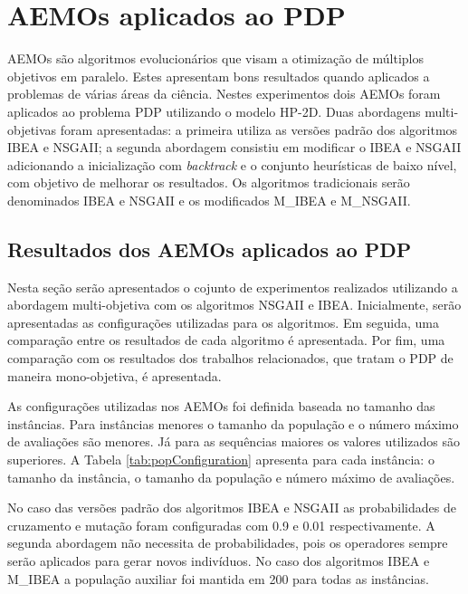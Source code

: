 \section{AEMOs aplicados ao PDP}

AEMOs são algoritmos evolucionários que visam a otimização de múltiplos objetivos em paralelo. Estes apresentam bons resultados quando aplicados a problemas de várias áreas da ciência.  Nestes experimentos dois AEMOs foram aplicados ao problema PDP utilizando o modelo HP-2D. Duas abordagens multi-objetivas foram apresentadas: a primeira utiliza as versões padrão dos algoritmos IBEA e NSGAII; a segunda abordagem consistiu em modificar o IBEA e NSGAII adicionando a inicialização com \textit{backtrack} e o conjunto heurísticas de baixo nível, com objetivo de melhorar os resultados. Os algoritmos tradicionais serão denominados IBEA e NSGAII e os modificados M\_IBEA e M\_NSGAII.




\subsection{Resultados dos AEMOs aplicados ao PDP}

Nesta seção serão apresentados o cojunto de experimentos realizados utilizando a abordagem multi-objetiva com os algoritmos NSGAII e IBEA. Inicialmente, serão apresentadas as configurações utilizadas para os algoritmos. Em seguida, uma comparação entre os resultados de cada algoritmo é apresentada. Por fim, uma comparação com os resultados dos trabalhos relacionados, que tratam o PDP de maneira mono-objetiva, é apresentada.

As configurações utilizadas nos AEMOs foi definida baseada no tamanho das instâncias. Para instâncias menores o tamanho da população e o número máximo de avaliações são menores. Já para as sequências maiores os valores utilizados são superiores. A Tabela \ref{tab:popConfiguration} apresenta para cada instância: o tamanho da instância, o tamanho da população e número máximo de avaliações.

No caso das versões padrão dos algoritmos IBEA e NSGAII as probabilidades de cruzamento e mutação foram configuradas com 0.9 e 0.01 respectivamente. A segunda abordagem não necessita de probabilidades, pois os operadores sempre serão aplicados para gerar novos indivíduos. No caso dos algoritmos IBEA e M\_IBEA a população auxiliar foi mantida em 200 para todas as instâncias.

